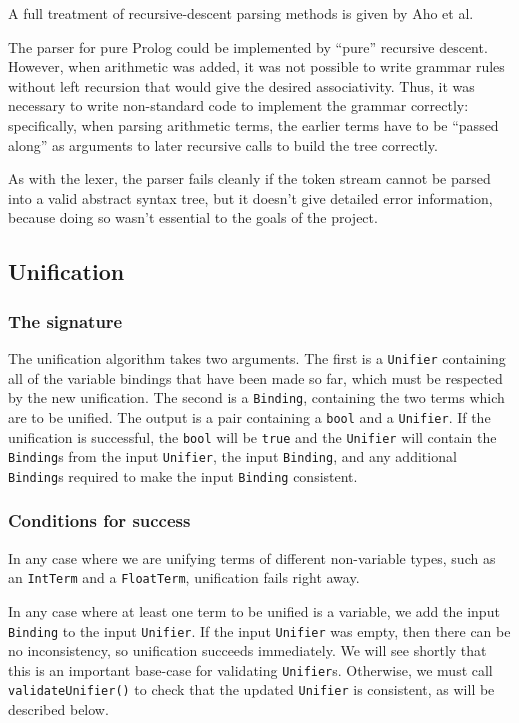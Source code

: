 \documentclass[12pt]{article}
\begin{document}
A full treatment of recursive-descent parsing methods is given by Aho et al. \cite{compiler}

The parser for pure Prolog could be implemented by ``pure'' recursive descent. 
However, when arithmetic was added, it was not possible to write grammar rules without left recursion that would give the desired associativity. 
Thus, it was necessary to write non-standard code to implement the grammar correctly: specifically, when parsing arithmetic terms, the earlier terms have to be ``passed along'' as arguments to later recursive calls to build the tree correctly.

As with the lexer, the parser fails cleanly if the token stream cannot be parsed into a valid abstract syntax tree, but it doesn't give detailed error information, because doing so wasn't essential to the goals of the project.

\subsection{Unification}

\subsubsection{The signature}

The unification algorithm takes two arguments. 
The first is a \verb|Unifier| containing all of the variable bindings that have been made so far, which must be respected by the new unification. 
The second is a \verb|Binding|, containing the two terms which are to be unified. 
The output is a pair containing a \verb|bool| and a \verb|Unifier|. 
If the unification is successful, the \verb|bool| will be \verb|true| and the \verb|Unifier| will contain the \verb|Binding|s from the input \verb|Unifier|, the input \verb|Binding|, and any additional \verb|Binding|s required to make the input \verb|Binding| consistent.

\subsubsection{Conditions for success}

In any case where we are unifying terms of different non-variable types, such as an \verb|IntTerm| and a \verb|FloatTerm|, unification fails right away. 

In any case where at least one term to be unified is a variable, we add the input \verb|Binding| to the input \verb|Unifier|. 
If the input \verb|Unifier| was empty, then there can be no inconsistency, so unification succeeds immediately. 
We will see shortly that this is an important base-case for validating \verb|Unifier|s. 
Otherwise, we must call \verb|validateUnifier()| to check that the updated \verb|Unifier| is consistent, as will be described below.
\end{document}
